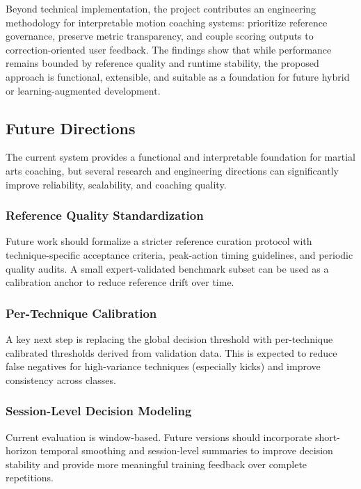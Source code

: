 \documentclass[12pt]{article}
\begin{document}
{Beyond technical implementation, the project contributes an engineering methodology for interpretable motion coaching systems: prioritize reference governance, preserve metric transparency, and couple scoring outputs to correction-oriented user feedback. The findings show that while performance remains bounded by reference quality and runtime stability, the proposed approach is functional, extensible, and suitable as a foundation for future hybrid or learning-augmented development.

\subsection{Future Directions}

The current system provides a functional and interpretable foundation for martial arts coaching, but several research and engineering directions can significantly improve reliability, scalability, and coaching quality.

\subsubsection{Reference Quality Standardization}

Future work should formalize a stricter reference curation protocol with technique-specific acceptance criteria, peak-action timing guidelines, and periodic quality audits. A small expert-validated benchmark subset can be used as a calibration anchor to reduce reference drift over time.

\subsubsection{Per-Technique Calibration}

A key next step is replacing the global decision threshold with per-technique calibrated thresholds derived from validation data. This is expected to reduce false negatives for high-variance techniques (especially kicks) and improve consistency across classes.

\subsubsection{Session-Level Decision Modeling}

Current evaluation is window-based. Future versions should incorporate short-horizon temporal smoothing and session-level summaries to improve decision stability and provide more meaningful training feedback over complete repetitions.

}
\end{document}
